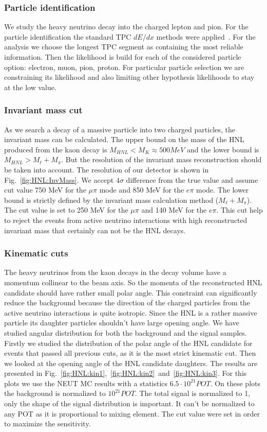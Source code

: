 \documentclass[../main.tex]{subfiles}
\begin{document}
\subsubsection{Particle identification}
We study the heavy neutrino decay into the charged lepton and pion. For the particle identification the standard TPC $dE/dx$ methods were applied~\cite{Abgrall2011}. For the analysis we choose the longest TPC segment as containing the most reliable information. Then the likelihood is build for each of the considered particle option: electron, muon, pion, proton. For particular particle selection we are constraining its likelihood and also limiting other hypothesis likelihoods to stay at the low value.

\subsubsection{Invariant mass cut}
As we search a decay of a massive particle into two charged particles, the invariant mass can be calculated. The upper bound on the mass of the HNL produced from the kaon decay is $M_{HNL}<M_K\approx500MeV$ and the lower bound is $M_{HNL}>M_\ell+M_\pi$. But the resolution of the invariant mass reconstruction should be taken into account. The resolution of our detector is shown in Fig.~\ref{fig:HNL:InvMass}. We accept $4\sigma$ difference from the true value and assume cut value 750 MeV for the $\mu\pi$ mode and 850 MeV for the $e\pi$ mode. The lower bound is strictly defined by the invariant mass calculation method ($M_\ell+M_\pi$). The cut value is set to 250 MeV for the $\mu\pi$ and 140 MeV for the $e\pi$. This cut help to reject the events from active neutrino interactions with high reconstructed invariant mass that certainly can not be the HNL decays.

\subsubsection{Kinematic cuts}
The heavy neutrinos from the kaon decays in the decay volume have a momentum collinear to the beam axis. So the momenta of the reconstructed HNL candidate should have rather small polar angle. This constraint can significantly reduce the background because the direction of the charged particles from the active neutrino interactions is quite isotropic. Since the HNL is a rather massive particle its daughter particles shouldn't have large opening angle. We have studied angular distribution for both the background and the signal samples. Firstly we studied the distribution of the polar angle of the HNL candidate for events that passed all previous cuts, as it is the most strict kinematic cut. Then we looked at the opening angle of the HNL candidate daughters. The results are presented in Fig.~\ref{fig:HNL:kin1},~\ref{fig:HNL:kin2}~and~\ref{fig:HNL:kin3}. For this plots we use the NEUT MC results with a statistics $6.5\cdot 10^{21} POT$. On these plots the background is normalized to $10^{21}POT$. The total signal is normalized to 1, only the shape of the signal distribution is important. It can't be normalized to any POT as it is proportional to mixing element. The cut value were set in order to maximize the sensitivity.
\end{document}
